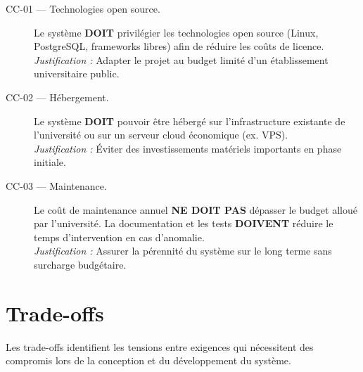 \begin{description}

    \item[CC-01 — Technologies open source.]
    Le système \textbf{DOIT} privilégier les technologies open source
    (Linux, PostgreSQL, frameworks libres) afin de réduire les
    coûts de licence.\\
    \textit{Justification :} Adapter le projet au budget limité d'un
    établissement universitaire public.

    \item[CC-02 — Hébergement.]
    Le système \textbf{DOIT} pouvoir être hébergé sur l'infrastructure
    existante de l'université ou sur un serveur cloud économique
    (ex. VPS).\\
    \textit{Justification :} Éviter des investissements matériels
    importants en phase initiale.

    \item[CC-03 — Maintenance.]
    Le coût de maintenance annuel \textbf{NE DOIT PAS} dépasser le budget
    alloué par l'université. La documentation et les tests \textbf{DOIVENT}
    réduire le temps d'intervention en cas d'anomalie.\\
    \textit{Justification :} Assurer la pérennité du système sur le long
    terme sans surcharge budgétaire.

\end{description}

\section{Trade-offs}


Les trade-offs identifient les tensions entre exigences qui nécessitent
des compromis lors de la conception et du développement du système.

